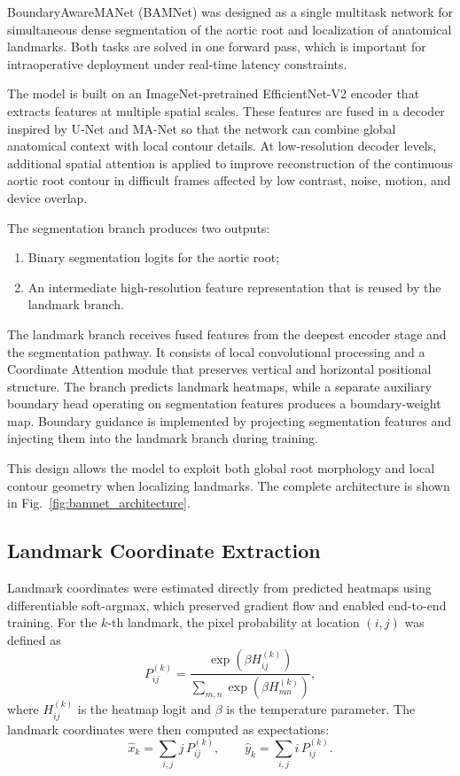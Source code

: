 \documentclass[utf8]{FrontiersinHarvard}
\begin{document}
BoundaryAwareMANet (BAMNet) was designed as a single multitask network for simultaneous dense segmentation of the aortic root and localization of 
anatomical landmarks. Both tasks are solved in one forward pass, which is important for intraoperative deployment under real-time latency constraints.

The model is built on an ImageNet-pretrained EfficientNet-V2 encoder that extracts features at multiple spatial scales. These features are fused 
in a decoder inspired by U-Net and MA-Net so that the network can combine global anatomical context with local contour details. At low-resolution 
decoder levels, additional spatial attention is applied to improve reconstruction of the continuous aortic root contour in difficult frames affected 
by low contrast, noise, motion, and device overlap.

The segmentation branch produces two outputs:
\begin{enumerate}
\item Binary segmentation logits for the aortic root;
\item An intermediate high-resolution feature representation that is reused by the landmark branch.
\end{enumerate}

The landmark branch receives fused features from the deepest encoder stage and the segmentation pathway. It consists of local convolutional 
processing and a Coordinate Attention module that preserves vertical and horizontal positional structure. The branch predicts landmark heatmaps, 
while a separate auxiliary boundary head operating on segmentation features produces a boundary-weight map. Boundary guidance is implemented by 
projecting segmentation features and injecting them into the landmark branch during training.

This design allows the model to exploit both global root morphology and local contour geometry when localizing landmarks. The complete architecture 
is shown in Fig.~\ref{fig:bamnet_architecture}.

\subsection{Landmark Coordinate Extraction}

Landmark coordinates were estimated directly from predicted heatmaps using differentiable soft-argmax, which preserved gradient flow and enabled 
end-to-end training. For the $k$-th landmark, the pixel probability at location $(i,j)$ was defined as
\begin{equation}
P_{ij}^{(k)}=
\frac{\exp\left(\beta H_{ij}^{(k)}\right)}
{\sum\limits_{m,n}\exp\left(\beta H_{mn}^{(k)}\right)},
\end{equation}
where $H_{ij}^{(k)}$ is the heatmap logit and $\beta$ is the temperature parameter. The landmark coordinates were then computed as expectations:
\begin{equation}
\hat{x}_k=\sum\limits_{i,j} j\,P_{ij}^{(k)}, \qquad
\hat{y}_k=\sum\limits_{i,j} i\,P_{ij}^{(k)}.
\end{equation}
\end{document}
